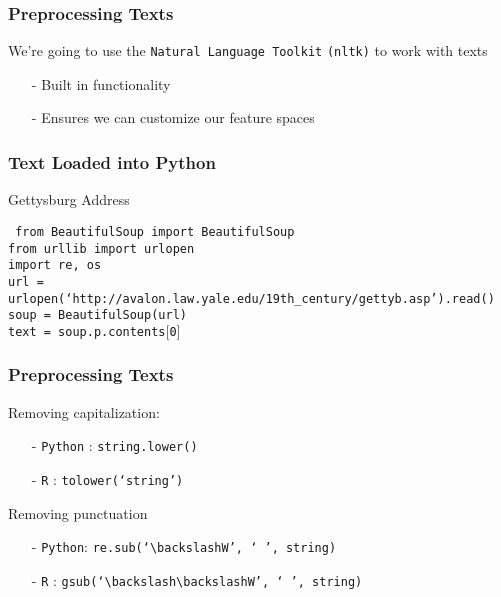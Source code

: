 \documentclass{beamer}
\numberwithin{equation}{section}
\begin{document}
\begin{frame}
\frametitle{Preprocessing Texts}

We're going to use the {\tt Natural Language Toolkit} {\tt (nltk)} to work with texts \\
\begin{itemize}
\item[-] Built in functionality
\item[-] Ensures we can customize our feature spaces
\end{itemize}

\end{frame}


\begin{frame}
\frametitle{Text Loaded into Python}


Gettysburg Address

\vspace{0.25in}
\begin{footnotesize}

{\tt
from BeautifulSoup import BeautifulSoup\\
from urllib import urlopen\\
import re, os\\

url  = urlopen(`http://avalon.law.yale.edu/19th\_century/gettyb.asp').read()\\


soup = BeautifulSoup(url)\\


text = soup.p.contents$[$0$]$\\

}

\end{footnotesize}

\end{frame}




\begin{frame}
\frametitle{Preprocessing Texts}

Removing capitalization:
\begin{itemize}
\item[-] {\tt Python} : \alert{{\tt string.lower()}}
\item[-] {\tt R} : \alert{{\tt tolower(`string')}}
\end{itemize}
Removing punctuation
\begin{itemize}
\item[-] {\tt Python}: \alert{{\tt re.sub(`$\backslash$W', ` ', string)}}
\item[-] {\tt R} : \alert{{\tt gsub(`$\backslash\backslash$W', ` ', string)}}
\end{itemize}


\end{frame}
\end{document}
